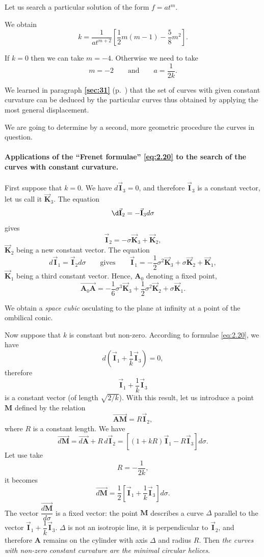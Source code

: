 \documentclass[leqno,11pt]{book}
\numberwithin{equation}{chapter}
\theoremstyle{shape1}
\theoremstyle{shapesmall}
\newcommand{\fsref}[1]{{\rm\textsection\textbf{\ref{sec:#1}}}}
\newcommand{\rvec}[1]{\vec{\mathbf{#1}}}
\newcommand{\ivec}{\rvec{I}}
\newcommand{\kvec}{\rvec{K}}
\begin{document}
Let us search a particular solution of the form $f=at^{m}$.

We obtain
\[
k=\frac{1}{at^{m+2}}\left[\frac{1}{2}m(m-1)-\frac{5}{8}m^{2}\right].
\]

If $k=0$ then we can take $m=-4$. Otherwise we need to take
\[
m=-2\qquad\text{and}\qquad a=\frac{1}{2k}.
\]

We learned in paragraph \fsref{31} (p.~\pageref{sec:31}) that the set of curves with given constant curvature can be deduced by the particular curves thus obtained by applying the most general displacement.

We are going to determine by a second, more geometric procedure the curves in question.

\paragraph{Applications of the ``Frenet formulae'' \eqref{eq:2.20} to the search of the curves with constant curvature.}
\label{sec:37}
First suppose that $k=0$. We have $d\ivec_{3}=0$, and therefore $\ivec_{3}$ is a constant vector, let us call it $\kvec_{3}$. The equation
\[
\d\ivec_{2}=-\ivec_{3}d\sigma
\]
gives
\[
\ivec_{2}=-\sigma\kvec_{3}+\kvec_{2},
\]
$\kvec_{2}$ being a new constant vector. The equation
\[
d\ivec_{1}=\ivec_{2}d\sigma\qquad\text{gives}\qquad\ivec_{1}=-\frac{1}{2}\sigma^{2}\kvec_{3}+\sigma\kvec_{2}+\kvec_{1},
\]
$\kvec_{1}$ being a third constant vector. Hence, $\mathbf{A}_{0}$ denoting a fixed point,
\[
\overrightarrow{\mathbf{A}_{0}\mathbf{A}}=-\frac{1}{6}\sigma^{3}\kvec_{3}+\frac{1}{2}\sigma^{2}\kvec_{2}+\sigma\kvec_{1}.
\]

We obtain a \emph{space cubic} osculating to the plane at infinity at a point of the ombilical conic.

Now suppose that $k$ is constant but non-zero. According to formulae \eqref{eq:2.20}, we have
\[
d\left(\ivec_{1}+\frac{1}{k}\ivec_{3}\right)=0,
\]
therefore
\[
\ivec_{1}+\frac{1}{k}\ivec_{3}
\]
is a constant vector (of length $\sqrt{2/k}$). With this result, let us introduce a point $\mathbf{M}$ defined by the relation
\[
\overrightarrow{\mathbf{AM}}=R\ivec_{2},
\]
where $R$ is a constant length. We have
\[
\overrightarrow{d\mathbf{M}}=\overrightarrow{d\mathbf{A}}+R\,d\ivec_{2}=[(1+kR)\ivec_{1}-R\ivec_{3}]d\sigma.
\]
Let use take
\[
R=-\frac{1}{2k},
\]
it becomes
\[
\overrightarrow{d\mathbf{M}}=\frac{1}{2}\left[\ivec_{1}+\frac{1}{k}\ivec_{3}\right]d\sigma.
\]
The vector $\dfrac{\overrightarrow{d\mathbf{M}}}{d\sigma}$ is a fixed vector: the point $\mathbf{M}$ describes a curve $\Delta$ parallel to the vector $\ivec_{1}+\dfrac{1}{k}\ivec_{3}$. $\Delta$ is not an isotropic line, it is perpendicular to $\ivec_{2}$, and therefore $\mathbf{A}$ remains on the cylinder with axis $\Delta$ and radius $R$. Then \emph{the curves with non-zero constant curvature are the minimal circular helices}.
\end{document}
